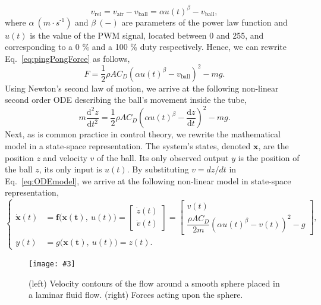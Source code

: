 \documentclass[10pt,twoside,openright]{article}
\newcommand{\mijnfiguur}[5][ht]{            %
    \begin{figure}[#1]                      %
        \begin{center}                      %
            \texttt{[image: \#3]}        %
        \end{center}
        \caption{#4\label{#5}}          %
    \end{figure}
    }
\begin{document}
\begin{equation}\label{eq:assumption_no_pressure_drop}
v_{\text{rel}} = v_{\text{air}} - v_{\text{ball}} = \alpha u(t)^\beta - v_{\text{ball}},
\end{equation}
where $\alpha~(m \cdot s^{\text{-}1})$ and $\beta~(-)$ are parameters of the power law function and $u(t)$ is the value of the PWM signal, located between 0 and 255, and corresponding to a 0 \% and a 100 \% duty respectively. Hence, we can rewrite Eq.~\ref{eq:pingPongForce} as follows,
\begin{equation}\label{eq:pingPongForceExtended}
F = \frac{1}{2} \rho A C_D \left( \alpha u(t)^\beta- v_{\text{ball}} \right)^2 - mg.
\end{equation}
Using Newton's second law of motion, we arrive at the following non-linear second order ODE describing the ball's movement inside the tube,
\begin{equation}\label{eq:ODEmodel}
m \frac{\text{d}^2 z}{\text{d}t^2} = \frac{1}{2} \rho A C_D \left(\alpha u(t)^\beta - \frac{\text{d}z}{\text{d}t}\right)^2 - m g.
\end{equation}
Next, as is common practice in control theory, we rewrite the mathematical model in a state-space representation. The system's states, denoted $\bm{x}$, are the position $z$ and velocity $v$ of the ball. Its only observed output $y$ is the position of the ball $z$, its only input is $u(t)$. By substituting $v = dz /dt$ in Eq.~\ref{eq:ODEmodel}, we arrive at the following non-linear model in state-space representation,
\begin{equation}\label{eq:pingPongModelStates}
\begin{cases}
\bm{\dot{x}}(t) &= \bm{f}\big(\bm{x(t)},~u(t)\big) = \begin{bmatrix} \dot{z}(t) \\ \dot{v}(t) \end{bmatrix} = \begin{bmatrix} v(t) \\ \dfrac{\rho A C_D}{2 m} (\alpha u(t)^\beta - v(t))^2 - g \end{bmatrix},\\
y(t) &= g\big(\bm{x(t)},~u(t)\big) = z(t).
\end{cases}
\end{equation}

\mijnfiguur[t!]{width=0.65\textwidth}{force_diagram.pdf}{(left) Velocity contours of the flow around a smooth sphere placed in a laminar fluid flow. (right) Forces acting upon the sphere.}{fig:ballInTube}
\end{document}

